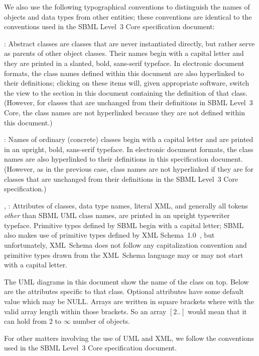 We also use the following typographical conventions to distinguish the
names of objects and data types from other entities; these conventions
are identical to the conventions used in the SBML Level~3 Core specification
document:

\begin{description}

\item {}: Abstract classes are classes that
  are never instantiated directly, but rather serve as parents of other
  object classes.  Their names begin with a capital letter and they are
  printed in a slanted, bold, sans-serif typeface.  In electronic
  document formats, the class names defined within this document are
  also hyperlinked to their definitions; clicking
  on these items will, given appropriate software, switch the view to
  the section in this document containing the definition of that class.
  (However, for classes that are unchanged from their definitions in
  SBML Level~3 Core, the class names are not hyperlinked because they
  are not defined within this document.)

\item {}: Names of ordinary (concrete) classes begin with a
  capital letter and are printed in an upright, bold, sans-serif
  typeface.  In electronic document formats, the class names are also
  hyperlinked to their definitions in this specification document.
  (However, as in the previous case, class names are not hyperlinked if
  they are for classes that are unchanged from their definitions in the
  SBML Level~3 Core specification.)

\item {}, : Attributes of classes, data
  type names, literal XML, and generally all tokens \emph{other} than
  SBML UML class names, are printed in an upright typewriter typeface.
  Primitive types defined by SBML begin with a capital letter; SBML also
  makes use of primitive types defined by XML
  Schema~1.0~\citep{biron:2000,fallside:2000,thompson:2000}, but
  unfortunately, XML~Schema does not follow any capitalization
  convention and primitive types drawn from the XML~Schema language may
  or may not start with a capital letter.

\end{description}

The UML diagrams in this document show the name of the class on top. Below are the attributes specific to that class. Optional attributes have some default value which may be NULL. Arrays are written in square brackets where with the valid array length within those brackets. So an array $[2..]$ would mean that it can hold from 2 to $\infty$ number of objects.

For other matters involving the use of UML and XML, we follow the
conventions used in the SBML Level~3 Core specification document.

